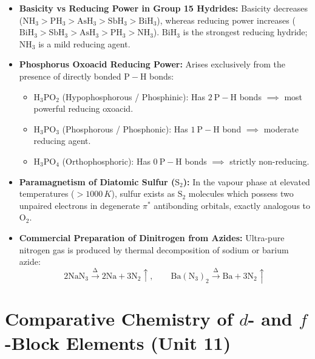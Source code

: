 \documentclass[10pt,a4paper]{article}
\begin{document}
\begin{ncertbox}
\begin{itemize}
  \item \textbf{Basicity vs Reducing Power in Group 15 Hydrides:} Basicity decreases ($\mathrm{NH_3 > PH_3 > AsH_3 > SbH_3 > BiH_3}$), whereas reducing power increases ($\mathrm{BiH_3 > SbH_3 > AsH_3 > PH_3 > NH_3}$). $\mathrm{BiH_3}$ is the strongest reducing hydride; $\mathrm{NH_3}$ is a mild reducing agent.
  \item \textbf{Phosphorus Oxoacid Reducing Power:} Arises exclusively from the presence of directly bonded $\mathrm{P-H}$ bonds:
  \begin{itemize}
    \item $\mathrm{H_3PO_2}$ (Hypophosphorous / Phosphinic): Has $2\ \mathrm{P-H}$ bonds $\implies$ most powerful reducing oxoacid.
    \item $\mathrm{H_3PO_3}$ (Phosphorous / Phosphonic): Has $1\ \mathrm{P-H}$ bond $\implies$ moderate reducing agent.
    \item $\mathrm{H_3PO_4}$ (Orthophosphoric): Has $0\ \mathrm{P-H}$ bonds $\implies$ strictly non-reducing.
  \end{itemize}
  \item \textbf{Paramagnetism of Diatomic Sulfur ($\mathrm{S_2}$):} In the vapour phase at elevated temperatures ($> 1000\,\si{K}$), sulfur exists as $\mathrm{S_2}$ molecules which possess two unpaired electrons in degenerate $\pi^*$ antibonding orbitals, exactly analogous to $\mathrm{O_2}$.
  \item \textbf{Commercial Preparation of Dinitrogen from Azides:} Ultra-pure nitrogen gas is produced by thermal decomposition of sodium or barium azide:
  \begin{equation*}
    \mathrm{2NaN_3 \xrightarrow{\Delta} 2Na + 3N_2\uparrow}, \qquad \mathrm{Ba(N_3)_2 \xrightarrow{\Delta} Ba + 3N_2\uparrow}
  \end{equation*}
\end{itemize}
\end{ncertbox}

\section{Comparative Chemistry of $d$- and $f$-Block Elements (Unit 11)}
\end{document}
